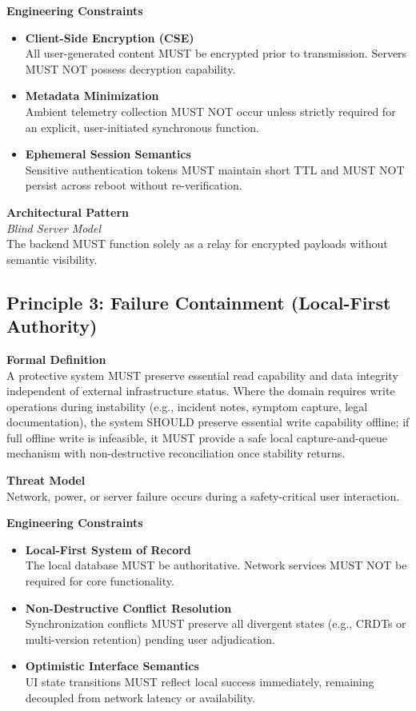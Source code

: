 \documentclass[12pt]{article}
\begin{document}
\textbf{Engineering Constraints}
\begin{itemize}
\item \textbf{Client-Side Encryption (CSE)}\\
  All user-generated content MUST be encrypted prior to transmission.
  Servers MUST NOT possess decryption capability.
\item \textbf{Metadata Minimization}\\
  Ambient telemetry collection MUST NOT occur unless strictly required for an explicit, user-initiated synchronous function.
\item \textbf{Ephemeral Session Semantics}\\
  Sensitive authentication tokens MUST maintain short TTL
  and MUST NOT persist across reboot without re-verification.
\end{itemize}

\textbf{Architectural Pattern}\\
\emph{Blind Server Model}\\
The backend MUST function solely as a relay for encrypted payloads without semantic visibility.

\subsection{Principle 3: Failure Containment (Local-First Authority)}

\textbf{Formal Definition}\\
A protective system MUST preserve essential read capability and data integrity independent of external infrastructure status. Where the domain requires write operations during instability (e.g., incident notes, symptom capture, legal documentation), the system SHOULD preserve essential write capability offline; if full offline write is infeasible, it MUST provide a safe local capture-and-queue mechanism with non-destructive reconciliation once stability returns.

\textbf{Threat Model}\\
Network, power, or server failure occurs during a safety-critical user interaction.

\textbf{Engineering Constraints}
\begin{itemize}
\item \textbf{Local-First System of Record}\\
  The local database MUST be authoritative.
  Network services MUST NOT be required for core functionality.
\item \textbf{Non-Destructive Conflict Resolution}\\
  Synchronization conflicts MUST preserve all divergent states
  (e.g., CRDTs or multi-version retention) pending user adjudication.
\item \textbf{Optimistic Interface Semantics}\\
  UI state transitions MUST reflect local success immediately,
  remaining decoupled from network latency or availability.
\end{itemize}
\end{document}
